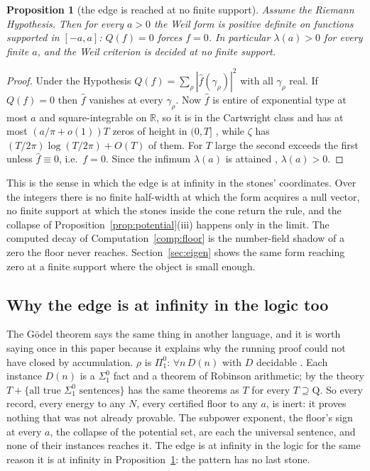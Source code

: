 \documentclass[11pt]{article}
\newtheorem{proposition}[theorem]{Proposition}
\theoremstyle{definition}
\theoremstyle{remark}
\newcommand{\R}{\mathbb R}
\begin{document}
\begin{proposition}[the edge is reached at no finite support]\label{prop:nofinite}
Assume the Riemann Hypothesis. Then for every $a>0$ the Weil form is positive definite on functions supported in $[-a,a]$: $Q(f)=0$ forces $f=0$. In particular $\lambda(a)>0$ for every finite $a$, and the Weil criterion is decided at no finite support.
\end{proposition}
\begin{proof}
Under the Hypothesis $Q(f)=\sum_\rho|\hat f(\gamma_\rho)|^2$ with all $\gamma_\rho$ real. If $Q(f)=0$ then $\hat f$ vanishes at every $\gamma_\rho$. Now $\hat f$ is entire of exponential type at most $a$ and square-integrable on $\R$, so it is in the Cartwright class and has at most $(a/\pi+o(1))T$ zeros of height in $(0,T]$ \cite[Ch.\ 8]{boas}, while $\zeta$ has $(T/2\pi)\log(T/2\pi)+O(T)$ of them. For $T$ large the second exceeds the first unless $\hat f\equiv0$, i.e.\ $f=0$. Since the infimum $\lambda(a)$ is attained \cite[Lemma 1.4]{window}, $\lambda(a)>0$.
\end{proof}

This is the sense in which the edge is at infinity in the stones' coordinates. Over the integers there is no finite half-width at which the form acquires a null vector, no finite support at which the stones inside the cone return the rule, and the collapse of Proposition~\ref{prop:potential}(iii) happens only in the limit. The computed decay of Computation~\ref{comp:floor} is the number-field shadow of a zero the floor never reaches. Section~\ref{sec:eigen} shows the same form reaching zero at a finite support where the object is small enough.

\subsection{Why the edge is at infinity in the logic too}
The Gödel theorem says the same thing in another language, and it is worth saying once in this paper because it explains why the running proof could not have closed by accumulation. $\rho$ is $\Pi^0_1$: $\forall n\,D(n)$ with $D$ decidable \cite{dmr}. Each instance $D(n)$ is a $\Sigma^0_1$ fact and a theorem of Robinson arithmetic; by \cite[Thm.\ 4.1]{gstring} the theory $T+\{\text{all true }\Sigma^0_1\text{ sentences}\}$ has the same theorems as $T$ for every $T\supseteq\mathrm Q$. So every record, every energy to any $N$, every certified floor to any $a$, is inert: it proves nothing that was not already provable. The subpower exponent, the floor's sign at every $a$, the collapse of the potential set, are each the universal sentence, and none of their instances reaches it. The edge is at infinity in the logic for the same reason it is at infinity in Proposition~\ref{prop:nofinite}: the pattern has no last stone.
\end{document}
